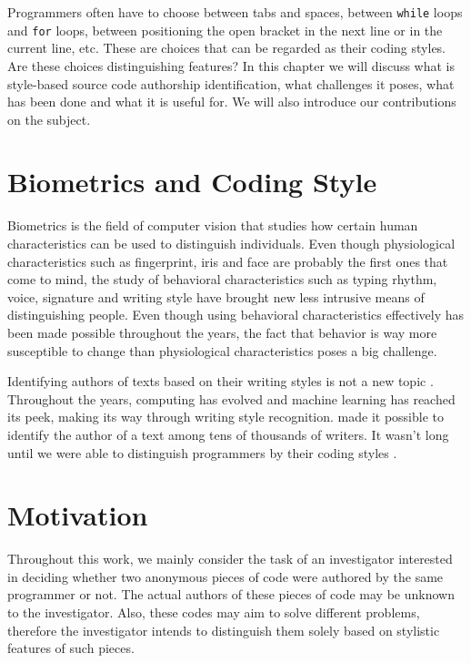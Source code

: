 
Programmers often have to choose between tabs and spaces, between \texttt{while} loops and \texttt{for} loops, between positioning the open bracket in the next line or in the current line, etc. These are choices that can be regarded as their coding styles. Are these choices distinguishing features? In this chapter we will discuss what is style-based source code authorship identification, what challenges it poses, what has been done and what it is useful for. We will also introduce our contributions on the subject.

\section{Biometrics and Coding Style}

Biometrics is the field of computer vision that studies how certain human characteristics can be used to distinguish individuals. Even though physiological characteristics such as fingerprint, iris and face are probably the first ones that come to mind, the study of behavioral characteristics such as typing rhythm, voice, signature and writing style have brought new less intrusive means of distinguishing people. Even though using behavioral characteristics effectively has been made possible throughout the years, the fact that behavior is way more susceptible to change than physiological characteristics poses a big challenge. %


Identifying authors of texts based on their writing styles is not a new topic \cite{mendenhall}. Throughout the years, computing has evolved and machine learning has reached its peek, making its way through writing style recognition.  made it possible to identify the author of a text among tens of thousands of writers. It wasn't long until we were able to distinguish programmers by their coding styles \cite{caliskan_2015}.

\section{Motivation}

Throughout this work, we mainly consider the task of an investigator interested in deciding whether two anonymous pieces of code were authored by the same programmer or not. The actual authors of these pieces of code may be unknown to the investigator. Also, these codes may aim to solve different problems, therefore the investigator intends to distinguish them solely based on stylistic features of such pieces.

